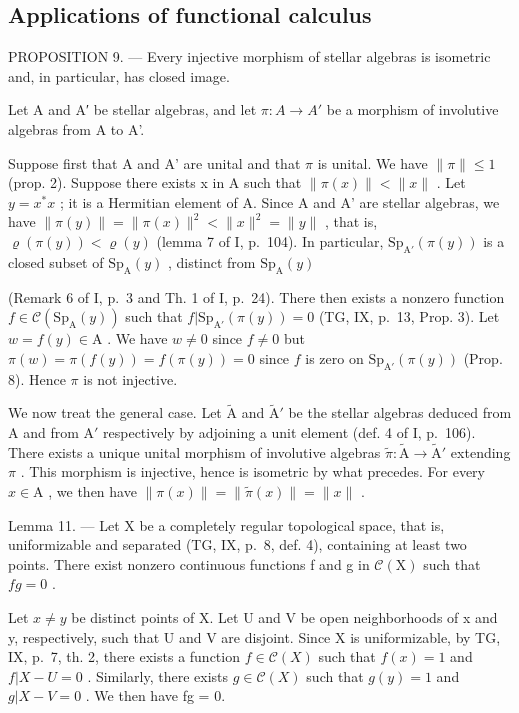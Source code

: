 \subsection{Applications of functional calculus}

PROPOSITION 9. --- Every injective morphism of stellar algebras is isometric and, in particular, has closed image.

Let A and A′ be stellar algebras, and let \(\pi\colon A\to A'\) be a morphism of involutive algebras from A to A'.

Suppose first that A and A' are unital and that \(\pi\) is unital. We have \(\|\pi\| \leqslant 1\) (prop. 2). Suppose there exists x in A such that \(\|\pi(x)\| < \|x\|\) . Let \(y = x^{*}x\) ; it is a Hermitian element of A. Since A and A' are stellar algebras, we have \(\|\pi(y)\| = \|\pi(x)\|^{2} < \|x\|^{2} = \|y\|\) , that is, \(\varrho(\pi(y)) < \varrho(y)\) (lemma 7 of I, p.~104). In particular, \(\mathrm{Sp}_{\mathrm{A}'}(\pi(y))\) is a closed subset of \(\mathrm{Sp}_{\mathrm{A}}(y)\) , distinct from \(\mathrm{Sp}_{\mathrm{A}}(y)\)

(Remark 6 of I, p.~3 and Th. 1 of I, p.~24). There then exists a nonzero function \(f \in \mathcal{C}(\mathrm{Sp}_{\mathrm{A}}(y))\) such that \(f| \mathrm{Sp}_{\mathrm{A}'}(\pi(y)) = 0\) (TG, IX, p.~13, Prop. 3). Let \(w = f(y) \in \mathrm{A}\) . We have \(w \neq 0\) since \(f \neq 0\) but \(\pi(w) = \pi(f(y)) = f(\pi(y)) = 0\) since \(f\) is zero on \(\mathrm{Sp}_{\mathrm{A}'}(\pi(y))\) (Prop. 8). Hence \(\pi\) is not injective.

We now treat the general case. Let \(\widetilde{\mathrm{A}}\) and \(\widetilde{\mathrm{A}}'\) be the stellar algebras deduced from A and from \(\mathrm{A}'\) respectively by adjoining a unit element (def. 4 of I, p.~106). There exists a unique unital morphism of involutive algebras \(\widetilde{\pi}\colon \widetilde{\mathrm{A}}\to \widetilde{\mathrm{A}}'\) extending \(\pi\) . This morphism is injective, hence is isometric by what precedes. For every \(x\in \mathrm{A}\) , we then have \(\| \pi (x)\| = \| \widetilde{\pi} (x)\| = \| x\|\) .

Lemma 11. --- Let X be a completely regular topological space, that is, uniformizable and separated (TG, IX, p.~8, def. 4), containing at least two points. There exist nonzero continuous functions f and g in \(\mathcal{C}(\mathrm{X})\) such that \(fg = 0\) .

Let \(x \neq y\) be distinct points of X. Let U and V be open neighborhoods of x and y, respectively, such that U and V are disjoint. Since X is uniformizable, by TG, IX, p.~7, th. 2, there exists a function \(f \in \mathcal{C}(X)\) such that \(f(x) = 1\) and \(f|X - U = 0\) . Similarly, there exists \(g \in \mathcal{C}(X)\) such that \(g(y) = 1\) and \(g|X - V = 0\) . We then have fg = 0.

